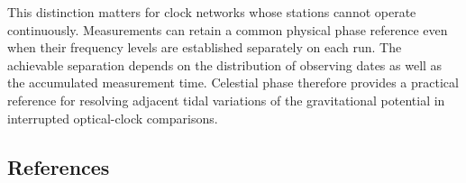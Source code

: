 \documentclass[
  12pt,
  a4paper,
]{article}
\begin{document}
This distinction matters for clock networks whose stations cannot
operate continuously. Measurements can retain a common physical phase
reference even when their frequency levels are established separately on
each run. The achievable separation depends on the distribution of
observing dates as well as the accumulated measurement time. Celestial
phase therefore provides a practical reference for resolving adjacent
tidal variations of the gravitational potential in interrupted
optical-clock comparisons.

\clearpage

\singlespacing\fontsize{11}{13}\selectfont

\hypertarget{references}{%
\subsection{References}\label{references}}
\end{document}
